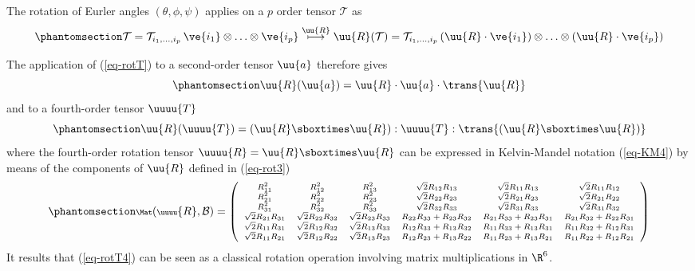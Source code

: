 \documentclass[
  letterpaper,
  DIV=11,
  numbers=noendperiod]{scrreprt}
\begin{document}
The rotation of Eurler angles \((\theta,\phi,\psi)\) applies on a \(p\)
order tensor \(\mathcal{T}\) as
\begin{equation}\phantomsection\label{eq-rotT}{
\mathcal{T}=
\mathcal{T}_{i_1,\ldots,i_p} \,\ve{i_1}\otimes\ldots\otimes\ve{i_{p}}
\overset{\uu{R}}{\longmapsto}
\uu{R}(\mathcal{T})=
\mathcal{T}_{i_1,\ldots,i_p} \,(\uu{R}\cdot\ve{i_1})\otimes\ldots\otimes(\uu{R}\cdot\ve{i_{p}})
}\end{equation}

The application of (\ref{eq-rotT}) to a second-order tensor \(\uu{a}\)
therefore gives \begin{equation}\phantomsection\label{eq-rotT2}{
\uu{R}(\uu{a})=\uu{R}\cdot 
\uu{a}
\cdot\trans{\uu{R}}
}\end{equation} and to a fourth-order tensor \(\uuuu{T}\)
\begin{equation}\phantomsection\label{eq-rotT4}{
\uu{R}(\uuuu{T})=(\uu{R}\sboxtimes\uu{R}):
\uuuu{T}
:\trans{(\uu{R}\sboxtimes\uu{R})}
}\end{equation} where the fourth-order rotation tensor
\(\uuuu{R}=\uu{R}\sboxtimes\uu{R}\) can be expressed in Kelvin-Mandel
notation (\ref{eq-KM4}) by means of the components of \(\uu{R}\) defined
in (\ref{eq-rot3}) \begin{equation}\phantomsection\label{eq-rot6}{
\scriptsize
\Mat(\uuuu{R},\mathcal{B})=
   \left(
\begin{array}{cccccc}
R_{1 1}^{2} & R_{1 2}^{2} & R_{1 3}^{2} & \sqrt{2}  R_{1 2}  R_{1 3} & \sqrt{2}  R_{1 1}  R_{1 3} & \sqrt{2}  R_{1 1}  R_{1 2} \\
R_{2 1}^{2} & R_{2 2}^{2} & R_{2 3}^{2} & \sqrt{2}  R_{2 2}  R_{2 3} & \sqrt{2}  R_{2 1}  R_{2 3} & \sqrt{2}  R_{2 1}  R_{2 2} \\
R_{3 1}^{2} & R_{3 2}^{2} & R_{3 3}^{2} & \sqrt{2}  R_{3 2}  R_{3 3} & \sqrt{2}  R_{3 1}  R_{3 3} & \sqrt{2}  R_{3 1}  R_{3 2} \\
\sqrt{2}  R_{2 1}  R_{3 1} & \sqrt{2}  R_{2 2}  R_{3 2} & \sqrt{2}  R_{2 3}  R_{3 3} & R_{2 2}  R_{3 3} + R_{2 3}  R_{3 2} & R_{2 1}  R_{3 3} + R_{2 3}  R_{3 1} & R_{2 1}  R_{3 2} + R_{2 2}  R_{3 1} \\
\sqrt{2}  R_{1 1}  R_{3 1} & \sqrt{2}  R_{1 2}  R_{3 2} & \sqrt{2}  R_{1 3}  R_{3 3} & R_{1 2}  R_{3 3} + R_{1 3}  R_{3 2} & R_{1 1}  R_{3 3} + R_{1 3}  R_{3 1} & R_{1 1}  R_{3 2} + R_{1 2}  R_{3 1} \\
\sqrt{2}  R_{1 1}  R_{2 1} & \sqrt{2}  R_{1 2}  R_{2 2} & \sqrt{2}  R_{1 3}  R_{2 3} & R_{1 2}  R_{2 3} + R_{1 3}  R_{2 2} & R_{1 1}  R_{2 3} + R_{1 3}  R_{2 1} & R_{1 1}  R_{2 2} + R_{1 2}  R_{2 1} \\
\end{array}
\right)
}\end{equation} It results that (\ref{eq-rotT4}) can be seen as a
classical rotation operation involving matrix multiplications in
\(\R^6\).
\end{document}
